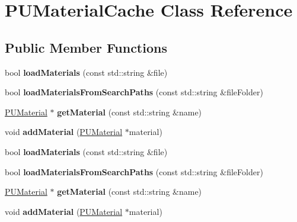 \hypertarget{classPUMaterialCache}{}\section{P\+U\+Material\+Cache Class Reference}
\label{classPUMaterialCache}
\subsection*{Public Member Functions}
\begin{DoxyCompactItemize}
\item 
\mbox{\label{classPUMaterialCache_ad694fff64522f18dd6fe786f5d339979}} 
bool {\bfseries load\+Materials} (const std\+::string \&file)
\item 
\mbox{\label{classPUMaterialCache_a5f9ac7b0f433693c867ca886616c0748}} 
bool {\bfseries load\+Materials\+From\+Search\+Paths} (const std\+::string \&file\+Folder)
\item 
\mbox{\label{classPUMaterialCache_a6d027426c124b882f090da47579b6afa}} 
\hyperlink{classPUMaterial}{P\+U\+Material} $\ast$ {\bfseries get\+Material} (const std\+::string \&name)
\item 
\mbox{\label{classPUMaterialCache_ac0634f16a6e49f011c72ab74997ec9dd}} 
void {\bfseries add\+Material} (\hyperlink{classPUMaterial}{P\+U\+Material} $\ast$material)
\item 
\mbox{\label{classPUMaterialCache_ad694fff64522f18dd6fe786f5d339979}} 
bool {\bfseries load\+Materials} (const std\+::string \&file)
\item 
\mbox{\label{classPUMaterialCache_a5f9ac7b0f433693c867ca886616c0748}} 
bool {\bfseries load\+Materials\+From\+Search\+Paths} (const std\+::string \&file\+Folder)
\item 
\mbox{\label{classPUMaterialCache_a93119b9263bb996eed348d060d863e5b}} 
\hyperlink{classPUMaterial}{P\+U\+Material} $\ast$ {\bfseries get\+Material} (const std\+::string \&name)
\item 
\mbox{\label{classPUMaterialCache_ac0634f16a6e49f011c72ab74997ec9dd}} 
void {\bfseries add\+Material} (\hyperlink{classPUMaterial}{P\+U\+Material} $\ast$material)
\end{DoxyCompactItemize}
